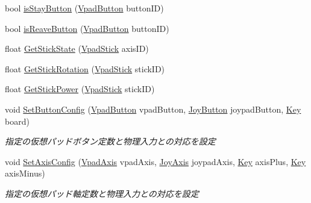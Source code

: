 \begin{DoxyCompactItemize}
\item 
bool \mbox{\hyperlink{class_k___input_1_1_input_g_l_f_w_afe17965f8cf7f982aa5c207a8df320df}{is\+Stay\+Button}} (\mbox{\hyperlink{namespace_k___input_ab1b3c957b1b7070e86ccd1a908f3a101}{Vpad\+Button}} button\+ID)
\item 
bool \mbox{\hyperlink{class_k___input_1_1_input_g_l_f_w_ac766fb5152814895ceb4ca938dfcecdb}{is\+Reave\+Button}} (\mbox{\hyperlink{namespace_k___input_ab1b3c957b1b7070e86ccd1a908f3a101}{Vpad\+Button}} button\+ID)
\item 
float \mbox{\hyperlink{class_k___input_1_1_input_g_l_f_w_a8caecda410096801715a7393acb0f049}{Get\+Stick\+State}} (\mbox{\hyperlink{namespace_k___input_a18bb7eb174cac2fd54b7a5b0d02a0116}{Vpad\+Stick}} axis\+ID)
\item 
float \mbox{\hyperlink{class_k___input_1_1_input_g_l_f_w_ada9df50df10a8636445468d3f04ad98e}{Get\+Stick\+Rotation}} (\mbox{\hyperlink{namespace_k___input_a18bb7eb174cac2fd54b7a5b0d02a0116}{Vpad\+Stick}} stick\+ID)
\item 
float \mbox{\hyperlink{class_k___input_1_1_input_g_l_f_w_a2c0ac7fae2b7f1c002a2649f28491cb9}{Get\+Stick\+Power}} (\mbox{\hyperlink{namespace_k___input_a18bb7eb174cac2fd54b7a5b0d02a0116}{Vpad\+Stick}} stick\+ID)
\item 
void \mbox{\hyperlink{class_k___input_1_1_input_g_l_f_w_aee6c383e0cdcf0f6eb8d3f51c0a4829f}{Set\+Button\+Config}} (\mbox{\hyperlink{namespace_k___input_ab1b3c957b1b7070e86ccd1a908f3a101}{Vpad\+Button}} vpad\+Button, \mbox{\hyperlink{namespace_k___input_a0fad93a64181d6776849d43118c26902}{Joy\+Button}} joypad\+Button, \mbox{\hyperlink{namespace_k___input_af62d80c77b12db01035e4b9aa27a09d6}{Key}} board)
\begin{DoxyCompactList}\small\item\em 指定の仮想パッドボタン定数と物理入力との対応を設定 \end{DoxyCompactList}\item 
void \mbox{\hyperlink{class_k___input_1_1_input_g_l_f_w_aa396c3e7ebc8dc6cad834a8caa36d549}{Set\+Axis\+Config}} (\mbox{\hyperlink{namespace_k___input_ae7980bb169b8a865a5e67d6fe06fb729}{Vpad\+Axis}} vpad\+Axis, \mbox{\hyperlink{namespace_k___input_a82230ae06723a21cc710ae3d66fd078f}{Joy\+Axis}} joypad\+Axis, \mbox{\hyperlink{namespace_k___input_af62d80c77b12db01035e4b9aa27a09d6}{Key}} axis\+Plus, \mbox{\hyperlink{namespace_k___input_af62d80c77b12db01035e4b9aa27a09d6}{Key}} axis\+Minus)
\begin{DoxyCompactList}\small\item\em 指定の仮想パッド軸定数と物理入力との対応を設定 \end{DoxyCompactList}\item 

\end{DoxyCompactItemize}
